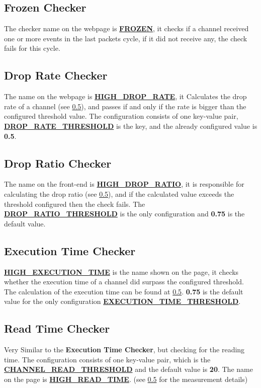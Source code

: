 \subsection{Frozen Checker}
The checker name on the webpage is \textbf{\url{FROZEN}}, it checks if a channel received one or more events in the last packets cycle, 
if it did not receive any, the check fails for this cycle.

\subsection{Drop Rate Checker}
The name on the webpage is \textbf{\url{HIGH_DROP_RATE}}, it Calculates the drop rate of 
a channel (see \ref{}), and passes if and only if the rate is bigger than the configured threshold value. The
configuration consists of one key-value pair, \textbf{\url{DROP_RATE_THRESHOLD}} is the key, and the already configured
value is \textbf{0.5}.

\subsection{Drop Ratio Checker}
The name on the front-end is \textbf{\url{HIGH_DROP_RATIO}}, it is responsible for calculating the drop ratio
(see \ref{}), and if the calculated value exceeds the threshold configured then the check fails. The 
\textbf{\url{DROP_RATIO_THRESHOLD}} is the only configuration and \textbf{0.75} is the default value.

\subsection{Execution Time Checker}
\textbf{\url{HIGH_EXECUTION_TIME}} is the name shown on the page, it checks whether the execution time of a channel
did surpass the configured threshold. The calculation of the execution time can be found at \ref{}. \textbf{0.75}
is the default value for the only configuration \textbf{\url{EXECUTION_TIME_THRESHOLD}}.

\subsection{Read Time Checker}
Very Similar to the \textbf{Execution Time Checker}, but checking for the reading time. The configuration
consists of one key-value pair, which is the \textbf{\url{CHANNEL_READ_THRESHOLD}} and the default value is 
\textbf{20}. The name on the page is \textbf{\url{HIGH_READ_TIME}}. (see \ref{} for the measurement details)

